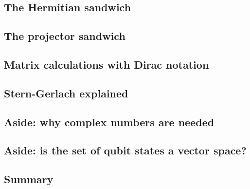 \documentclass[main.tex]{subfiles}
\begin{document}
\subsection{The Hermitian sandwich}

\subsection{The projector sandwich}

\subsection{Matrix calculations with Dirac notation}

\subsection{Stern-Gerlach explained}

\subsection{Aside: why complex numbers are needed}

\subsection{Aside: is the set of qubit states a vector space?}

\subsection{Summary}
\end{document}
